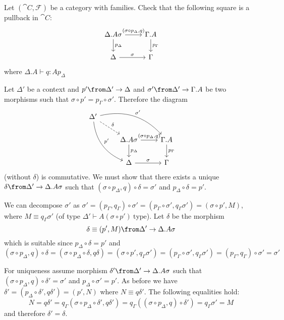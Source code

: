 \begin{exercise}
  Let $(\cat C, \mathcal F)$ be a category with families.  Check that the
  following square is a pullback in $\cat{C}$:
  \[
    \begin{tikzcd}
      \Delta.A\sigma \arrow{r}{(\sigma \circ p_\Delta, q)} \arrow{d}{p_\Delta} & \Gamma.A \arrow{d}{p_\Gamma}\\
      \Delta \arrow{r}{\sigma} & \Gamma
    \end{tikzcd}
  \]
  where $\Delta.A \vdash q : A p_\Delta$
\end{exercise}
\begin{answer}
  Let $\Delta'$ be a context and $p' \from \Delta' \to \Delta$ and $\sigma'
  \from \Delta' \to \Gamma.A$ be two morphisms such that $\sigma \circ p' =
  p_\Gamma \circ \sigma'$. Therefore the diagram
  \[
    \begin{tikzcd}
      \Delta' \arrow[bend right=30]{ddr}{p'} \arrow[dashed]{dr}{\delta} \arrow[bend left=30]{drr}{\sigma'}&   &\\
          & \Delta.A\sigma \arrow{r}{(\sigma \circ p_\Delta, q)} \arrow{d}{p_\Delta} & \Gamma.A \arrow{d}{p_\Gamma}\\
          & \Delta \arrow{r}{\sigma} & \Gamma
    \end{tikzcd}
  \]
  (without $\delta$) is commutative. We must show that there exists a unique
  $\delta \from \Delta' \to \Delta.A\sigma$ such that $(\sigma \circ p_\Delta,
  q) \circ \delta = \sigma'$ and $p_\Delta \circ \delta = p'$.

  We can decompose $\sigma'$ as $\sigma' = (p_\Gamma, q_\Gamma) \circ \sigma' =
  (p_\Gamma \circ \sigma', q_\Gamma\sigma') = (\sigma \circ p', M)$, where $M
  \equiv q_\Gamma\sigma'$ (of type $\Delta' \vdash A(\sigma \circ p')
  ~\text{type}$). Let $\delta$ be the morphism
  \[
    \delta \equiv (p', M) \from \Delta' \to \Delta.A\sigma
  \]
  which is suitable since $p_\Delta \circ \delta = p'$ and
  \[
    (\sigma \circ p_\Delta, q) \circ \delta =
    (\sigma \circ p_\Delta \circ \delta, q\delta) =
    (\sigma \circ p', q_\Gamma\sigma') =
    (p_\Gamma \circ \sigma', q_\Gamma\sigma') =
    (p_\Gamma, q_\Gamma) \circ \sigma' =
    \sigma'
  \]

  For uniqueness assume morphism $\delta' \from \Delta' \to \Delta.A\sigma$
  such that $(\sigma \circ p_\Delta, q) \circ \delta' = \sigma'$ and $p_\Delta
  \circ \sigma' = p'$. As before we have $\delta' = (p_\Delta \circ \delta',
  q\delta') = (p', N)$ where $N \equiv q\delta'$. The following equalities
  hold:
  \[
    N = q\delta' = q_\Gamma(\sigma \circ p_\Delta \circ \delta', q\delta') = q_\Gamma((\sigma \circ p_\Delta, q) \circ \delta') = q_\Gamma\sigma' = M
  \]
  and therefore $\delta' = \delta$.
\end{answer}

